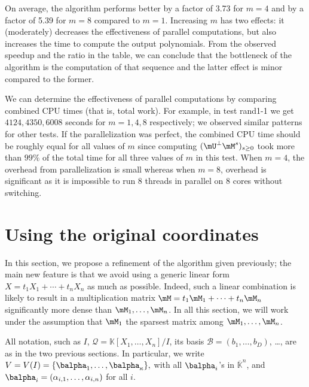 \documentclass[12pt]{article}
\newcommand{\basis}{\mathscr{B}}
\newcommand{\lf}{X}
\newcommand{\residueI}{\mathscr{Q}}
\def\dg{\kappa}
\def\K{\mathbb{K}}
\def\K {\ensuremath{\mathbb{K}}}
\def\Kbar {{\ensuremath{\overline{\mathbb{K}}}}}
\begin{document}
On average, the algorithm performs better by a factor of 3.73 for
$m=4$ and by a factor of 5.39 for $m=8$ compared to $m=1$. Increasing
$m$ has two effects: it (moderately) decreases the effectiveness of
parallel computations, but also increases the time to compute the
output polynomials. From the observed speedup and the ratio in the
table, we can conclude that the bottleneck of the algorithm is
the computation of that sequence and the latter effect is minor
compared to the former.

We can determine the effectiveness of parallel computations by
comparing combined CPU times (that is, total work).  For example, in
test rand1-1 we get $4124, 4350, 6008$ seconds for $m=1,4,8$
respectively; we observed similar patterns for other tests. If the
parallelization was perfect, the combined CPU time should be roughly
equal for all values of $m$ since computing $(\mU^{\perp}
\mM^s)_{s\ge0}$ took more than $99\%$ of the total time for all three
values of $m$ in this test. When $m=4$, the overhead from
parallelization is small whereas when $m=8$, overhead is significant
as it is impossible to run 8 threads in parallel on 8 cores without
switching.


\section{Using the original coordinates}

In this section, we propose a refinement of the algorithm given
previously; the main new feature is that we avoid using a generic
linear form $\lf = t_1 X_1 + \cdots + t_n X_n$ as much as possible.
Indeed, such a linear combination is likely to result in a
multiplication matrix $\mM = t_1 \mM_1 + \cdots + t_n \mM_n$
significantly more dense than $\mM_1,\dots,\mM_n$. In all this
section, we will work under the assumption that $\mM_1$ the sparsest
matrix among $\mM_1,\dots,\mM_n$.

All notation, such as $I$, $\residueI=\K[X_1,\dots,X_n]/I$, its basis
$\basis=(b_1,\dots,b_D)$, \dots, are as in the two previous sections.
In particular, we write $V=V(I)=\{\balpha_1,\dots,\balpha_\dg\},$ with
all $\balpha_i$'s in $\Kbar^n$, and
$\balpha_i=(\alpha_{i,1},\dots,\alpha_{i,n})$ for all $i$.

\end{document}
